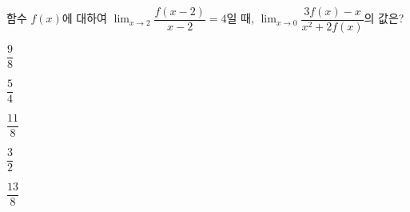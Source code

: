 함수 $f(x)$에 대하여 $\displaystyle\lim_{x\to 2} \dfrac{f(x-2)}{x-2}=4$일 때, $\displaystyle\lim_{x\to 0} \dfrac{3f(x)-x}{x^2+2f(x)}$의 값은?
\begin{choices32}{\rule[-3ex]{0pt}{8ex}$\dfrac{9}{8}$}{\rule[-3ex]{0pt}{8ex}$\dfrac{5}{4}$}{\rule[-3ex]{0pt}{8ex}$\dfrac{11}{8}$}{\rule[-3ex]{0pt}{8ex}$\dfrac{3}{2}$}{\rule[-3ex]{0pt}{8ex}$\dfrac{13}{8}$}\end{choices32}
